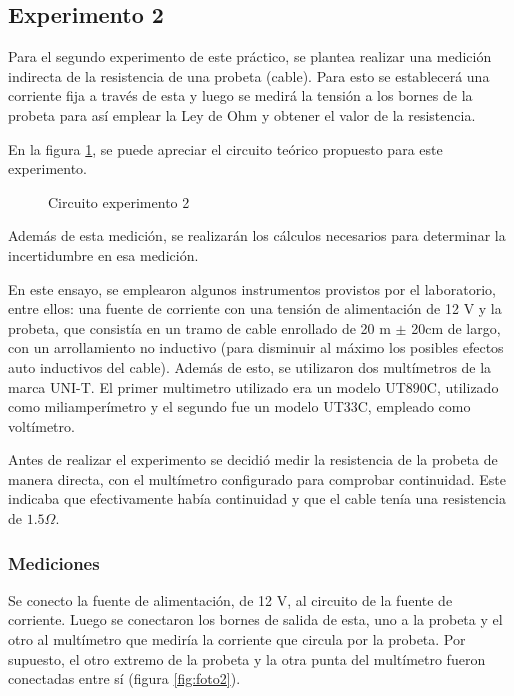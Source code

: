\subsection{Experimento 2}



Para el segundo experimento de este práctico, se plantea realizar una medición indirecta de la resistencia de una probeta (cable). Para esto se establecerá una corriente fija a través de esta y luego se medirá la tensión a los bornes de la probeta para así emplear la Ley de Ohm y obtener el valor de la resistencia.

En la figura \ref{fig:CircExp2}, se puede apreciar el circuito teórico propuesto para este experimento. 

\begin{figure}[H]
    \centering
    {}
    \caption{Circuito experimento 2}
    \label{fig:CircExp2}
\end{figure}

Además de esta medición, se realizarán los cálculos necesarios para determinar la incertidumbre en esa medición.

En este ensayo, se emplearon algunos instrumentos provistos por el laboratorio, entre ellos: una fuente de corriente con una tensión de alimentación de 12 V y la probeta, que consistía en un tramo de cable enrollado de 20 m $\pm$ 20cm de largo, con un arrollamiento no inductivo (para disminuir al máximo los posibles efectos auto inductivos del cable). Además de esto, se utilizaron dos multímetros de la marca UNI-T. El primer multimetro utilizado era un modelo UT890C, utilizado como miliamperímetro y el segundo fue un modelo UT33C, empleado como voltímetro. 

Antes de realizar el experimento se decidió medir la resistencia de la probeta de manera directa, con el multímetro configurado para comprobar continuidad. Este indicaba que efectivamente había continuidad y que el cable tenía una resistencia de $1.5 \Omega$. 

\subsubsection{Mediciones}

Se conecto la fuente de alimentación, de 12 V, al circuito de la fuente de corriente. Luego se conectaron los bornes de salida de esta, uno a la probeta y el otro al multímetro que mediría la corriente que circula por la probeta. Por supuesto, el otro extremo de la probeta y la otra punta del multímetro fueron conectadas entre sí (figura \ref{fig:foto2}).

